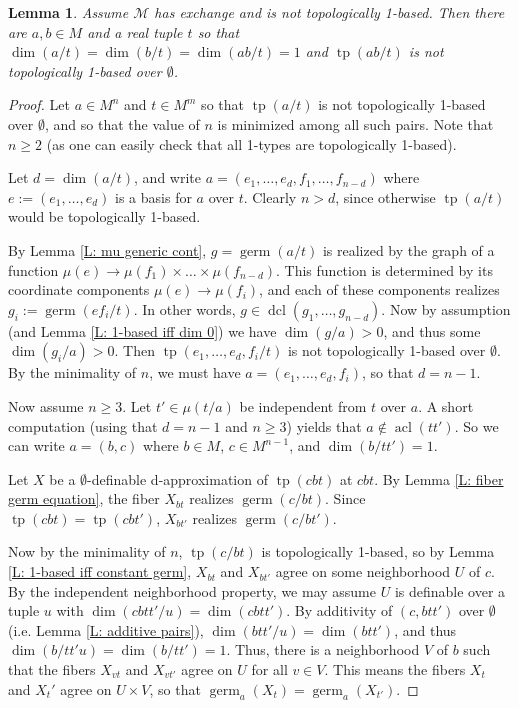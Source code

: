 \documentclass{amsart}
\newtheorem{lemma}[theorem]{Lemma}
\theoremstyle{definition}
\newcommand{\acl}{\operatorname{acl}}
\newcommand{\dcl}{\operatorname{dcl}}
\newcommand{\tp}{\operatorname{tp}}
\begin{document}
\begin{lemma} Assume $\mathcal M$ has exchange and is not topologically 1-based. Then there are $a,b\in M$ and a real tuple $t$ so that $\dim(a/t)=\dim(b/t)=\dim(ab/t)=1$ and $\tp(ab/t)$ is not topologically 1-based over $\emptyset$.
\end{lemma}
\begin{proof}
    Let $a\in M^n$ and $t\in M^m$ so that $\tp(a/t)$ is not topologically 1-based over $\emptyset$, and so that the value of $n$ is minimized among all such pairs. Note that $n\geq 2$ (as one can easily check that all 1-types are topologically 1-based).
    
    Let $d=\dim(a/t)$, and write $a=(e_1,\dots,e_d,f_1,\dots,f_{n-d})$ where $e:=(e_1,\dots,e_d)$ is a basis for $a$ over $t$. Clearly $n>d$, since otherwise $\tp(a/t)$ would be topologically 1-based.
    
    By Lemma \ref{L: mu generic cont}, $g=\operatorname{germ}(a/t)$ is realized by the graph of a function $\mu(e)\rightarrow\mu(f_1)\times\dots\times\mu(f_{n-d})$. This function is determined by its coordinate components $\mu(e)\rightarrow\mu(f_i)$, and each of these components realizes $g_i:=\operatorname{germ}(ef_i/t)$. In other words, $g\in\dcl(g_1, \dots, g_{n-d})$. Now by assumption (and Lemma \ref{L: 1-based iff dim 0}) we have $\dim(g/a)>0$, and thus some $\dim(g_i/a)>0$. Then $\tp(e_1,\dots,e_d,f_i/t)$ is not topologically 1-based over $\emptyset$. By the minimality of $n$, we must have $a=(e_1,\dots,e_d,f_i)$, so that $d=n-1$.

    Now assume $n\geq 3$. Let $t'\in\mu(t/a)$ be independent from $t$ over $a$. A short computation (using that $d=n-1$ and $n\geq 3$) yields that $a\notin\acl(tt')$. So we can write $a=(b,c)$ where $b\in M$, $c\in M^{n-1}$, and $\dim(b/tt')=1$.

    Let $X$ be a $\emptyset$-definable d-approximation of $\tp(cbt)$ at $cbt$. By Lemma \ref{L: fiber germ equation}, the fiber $X_{bt}$ realizes $\operatorname{germ}(c/bt)$. Since $\tp(cbt)=\tp(cbt')$, $X_{bt'}$ realizes $\operatorname{germ}(c/bt')$. 
    
    Now by the minimality of $n$, $\tp(c/bt)$ is topologically 1-based, so by Lemma \ref{L: 1-based iff constant germ}, $X_{bt}$ and $X_{bt'}$ agree on some neighborhood $U$ of $c$. By the independent neighborhood property, we may assume $U$ is definable over a tuple $u$ with $\dim(cbtt'/u)=\dim(cbtt')$. By additivity of $(c,btt')$ over $\emptyset$ (i.e. Lemma \ref{L: additive pairs}), $\dim(btt'/u)=\dim(btt')$, and thus $\dim(b/tt'u)=\dim(b/tt')=1$. Thus, there is a neighborhood $V$ of $b$ such that the fibers $X_{vt}$ and $X_{vt'}$ agree on $U$ for all $v\in V$. This means the fibers $X_t$ and $X_t'$ agree on $U\times V$, so that $\operatorname{germ}_a(X_t)=\operatorname{germ}_a(X_{t'})$.


\end{proof}
\end{document}
